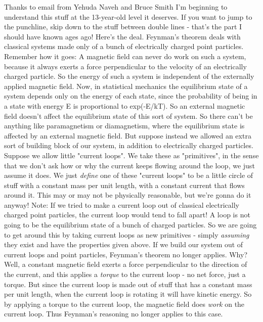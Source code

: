 Thanks to email from Yehuda Naveh and Bruce Smith
I'm beginning to understand this stuff at the 13-year-old level it deserves.
If you want to jump to the punchline, skip down to the stuff between double
lines - that's the part I should have known ages ago!
Here's the deal.  Feynman's theorem deals with classical systems made only 
of a bunch of electrically charged point particles.  Remember how it goes:
A magnetic field can never do work on such a system, because it always 
exerts a force perpendicular to the velocity of an electrically charged 
particle.  So the energy of such a system is independent of the externally 
applied magnetic field.  Now, in statistical mechanics the equilibrium state of
a system depends only on the energy of each state, since the probability
of being in a state with energy E is proportional to exp(-E/kT).  So
an external magnetic field doesn't affect the equilibrium state of
this sort of system.  So there can't be anything like paramagnetism
or diamagnetism, where the equilibrium state is affected by an external
magnetic field.
But suppose instead we allowed an extra sort of building block of our
system, in addition to electrically charged particles.  Suppose we
allow little "current loops".  We take these as "primitives", in the
sense that we don't ask how or why the current keeps flowing around
the loop, we just assume it does.  We just \emph{define} one of these 
"current loops" to be a little circle of stuff with a constant 
mass per unit length, with a constant current that flows around it.  
This may or may not be physically reasonable, but we're gonna do it anyway!
Note: If we tried to make a current loop out of classical electrically
charged point particles, the current loop would tend to fall apart!  A
loop is not going to be the equilibrium state of a bunch of charged
particles.  So we are going to get around this by taking current loops
as new primitives - simply \emph{assuming} 
they exist and have the properties
given above.
If we build our system out of current loops and point particles, 
Feynman's theorem no longer applies.   Why?  Well, a constant magnetic
field exerts a force perpendicular to the direction of the current, 
and this applies a \emph{torque} to the current loop - no net force, just
a torque.  But since the current loop is made out of stuff that has
a constant mass per unit length, when the current loop is rotating
it will have kinetic energy.  So by applying a torque to the current loop,
the magnetic field does \emph{work} on the current loop.  Thus Feynman's
reasoning no longer applies to this case.
